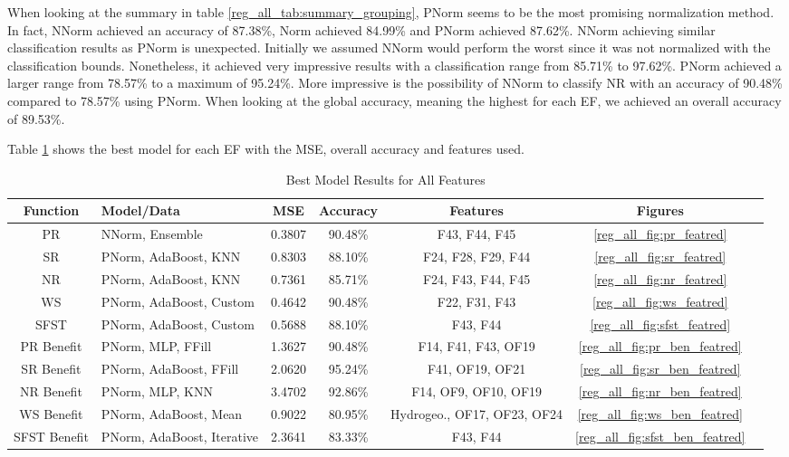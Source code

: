 \documentclass[12pt,letterpaper]{article}
\begin{document}
When looking at the summary in table \ref{reg_all_tab:summary_grouping}, \ac{PNorm} seems to be the most promising normalization method.
In fact, \ac{NNorm} achieved an accuracy of 87.38\%, \ac{Norm} achieved 84.99\% and \ac{PNorm} achieved 87.62\%.
\ac{NNorm} achieving similar classification results as \ac{PNorm} is unexpected.
Initially we assumed \ac{NNorm} would perform the worst since it was not normalized with the classification bounds.
Nonetheless, it achieved very impressive results with a classification range from 85.71\% to 97.62\%.
\ac{PNorm} achieved a larger range from 78.57\% to a maximum of 95.24\%.
More impressive is the possibility of \ac{NNorm} to classify \ac{NR} with an accuracy of 90.48\% compared to 78.57\% using \ac{PNorm}.
When looking at the global accuracy, meaning the highest for each \ac{EF}, we achieved an overall accuracy of 89.53\%.


Table \ref{reg_all_tab:best} shows the best model for each \ac{EF} with the MSE, overall accuracy and features used.

\begin{table}[H]
\centering
\begin{tabular}{|c|p{3cm}|c|c|c|c|c|}
\hline
\textbf{Function} & \textbf{Model/Data} & \textbf{MSE} & \textbf{Accuracy} & \textbf{Features} & \textbf{Figures}  \\
\hline
 PR & \ac{NNorm}, Ensemble & 0.3807 & 90.48\% & F43, F44, F45 & \ref{reg_all_fig:pr_featred} \\
\hline
 SR & \ac{PNorm}, AdaBoost, KNN & 0.8303 & 88.10\% & F24, F28, F29, F44 & \ref{reg_all_fig:sr_featred} \\
\hline
 NR & \ac{PNorm}, AdaBoost, KNN & 0.7361 & 85.71\% & F24, F43, F44, F45 & \ref{reg_all_fig:nr_featred} \\
\hline
 WS & \ac{PNorm}, AdaBoost, Custom & 0.4642 & 90.48\% & F22, F31, F43 & \ref{reg_all_fig:ws_featred}\\
\hline
 SFST &  \ac{PNorm}, AdaBoost, Custom & 0.5688 & 88.10\% &  F43, F44 & \ref{reg_all_fig:sfst_featred}\\
\hline
 PR Benefit & \ac{PNorm}, MLP, FFill & 1.3627 & 90.48\% & F14, F41, F43, OF19 & \ref{reg_all_fig:pr_ben_featred}\\
\hline
SR Benefit & \ac{PNorm}, AdaBoost, FFill & 2.0620 & 95.24\% &  F41, OF19, OF21& \ref{reg_all_fig:sr_ben_featred}\\
\hline
 NR Benefit & \ac{PNorm}, MLP, KNN & 3.4702 & 92.86\% & F14, OF9, OF10, OF19 & \ref{reg_all_fig:nr_ben_featred}\\
\hline
 WS Benefit & \ac{PNorm}, AdaBoost, Mean & 0.9022 & 80.95\% & Hydrogeo., OF17, OF23, OF24  & \ref{reg_all_fig:ws_ben_featred}\\
\hline
 SFST Benefit & \ac{PNorm}, AdaBoost, Iterative & 2.3641 & 83.33\% & F43, F44 & \ref{reg_all_fig:sfst_ben_featred} \\
\hline
\end{tabular}
\caption{Best Model Results for All Features}
\label{reg_all_tab:best}
\end{table}
\end{document}
